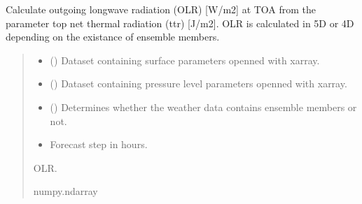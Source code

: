 \documentclass[a4paper,11pt,english]{sphinxmanual}
\begin{document}

\begin{fulllineitems}
\label{\detokenize{modules:envlib.processing_surf_vars.get_olr}}
\pysigstartsignatures
{}
\pysigstopsignatures
\sphinxAtStartPar
Calculate outgoing longwave radiation (OLR) {[}W/m2{]} at TOA from the parameter top net thermal radiation (ttr)
{[}J/m2{]}. OLR is calculated in 5D or 4D depending on the existance of ensemble members.
\begin{quote}\begin{description}
\begin{itemize}
\item {} 
\sphinxAtStartPar
{} () \textendash{} Dataset containing surface parameters openned with xarray.

\item {} 
\sphinxAtStartPar
{} () \textendash{} Dataset containing pressure level parameters openned with xarray.

\item {} 
\sphinxAtStartPar
{} () \textendash{} Determines whether the weather data contains ensemble members or not.

\item {} 
\sphinxAtStartPar
{} \textendash{} Forecast step in hours.

\end{itemize}

\sphinxAtStartPar
OLR.

\sphinxAtStartPar
numpy.ndarray

\end{description}\end{quote}

\end{fulllineitems}
\end{document}
